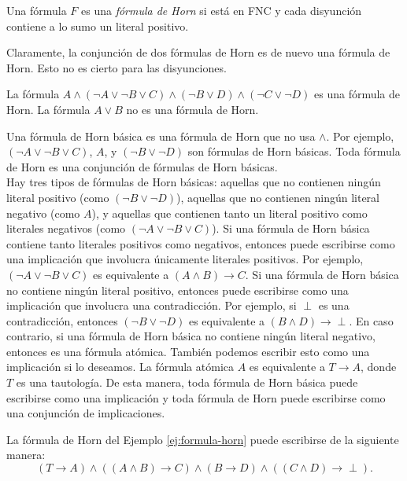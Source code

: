 \message{ !name(main.tex)}\documentclass[12pt,a4paper]{book}
\begin{document}
    \begin{definicion}\label{def:formula-horn}
        Una fórmula $F$ es una \textit{fórmula de Horn} si está en FNC y cada disyunción contiene a lo sumo un literal
        positivo.
    \end{definicion}

    Claramente, la conjunción de dos fórmulas de Horn es de nuevo una fórmula de Horn. Esto no es cierto para las
    disyunciones.

    \begin{ejemplo}\label{ej:formula-horn}
        La fórmula $A\wedge(\neg A\vee\neg B\vee C)\wedge(\neg B\vee D)\wedge(\neg C\vee\neg D)$ es una fórmula de Horn. La
        fórmula $A\vee B$ no es una fórmula de Horn.
    \end{ejemplo}

    Una fórmula de Horn básica es una fórmula de Horn que no usa $\wedge$. Por ejemplo, $(\neg A\vee\neg B\vee C)$, $A$, y
    $(\neg B\vee\neg D)$ son fórmulas de Horn básicas. Toda fórmula de Horn es una conjunción de fórmulas de Horn básicas.\\
    Hay tres tipos de fórmulas de Horn básicas: aquellas que no contienen ningún literal positivo (como $(\neg B\vee\neg D)$),
    aquellas que no contienen ningún literal negativo (como $A$), y aquellas que contienen tanto un literal positivo como
    literales negativos (como $(\neg A\vee\neg B\vee C)$). Si una fórmula de Horn básica contiene tanto literales positivos
    como negativos, entonces puede escribirse como una implicación que involucra únicamente literales positivos. Por
    ejemplo, $(\neg A\vee\neg B\vee C)$ es equivalente a $(A\wedge B)\rightarrow C$. Si una fórmula de Horn básica no contiene
    ningún literal positivo, entonces puede escribirse como una implicación que involucra una contradicción. Por ejemplo, si
    $\perp$ es una contradicción, entonces $(\neg B\vee\neg D)$ es equivalente a $(B\wedge D)\rightarrow\perp$. En caso
    contrario, si una fórmula de Horn básica no contiene ningún literal negativo, entonces es una fórmula atómica. También
    podemos escribir esto como una implicación si lo deseamos. La fórmula atómica $A$ es equivalente a $T\rightarrow A$,
    donde $T$ es una tautología. De esta manera, toda fórmula de Horn básica puede escribirse como una implicación y toda
    fórmula de Horn puede escribirse como una conjunción de implicaciones.

    \begin{ejemplo}\label{ej:horn-como-implicaciones}
        La fórmula de Horn del Ejemplo \ref{ej:formula-horn} puede escribirse de la siguiente manera:
        \begin{equation*}
            (T\rightarrow A)\wedge((A\wedge B)\rightarrow C)\wedge(B\rightarrow D)\wedge((C\wedge D)\rightarrow\perp).
        \end{equation*}
    \end{ejemplo}
\end{document}
